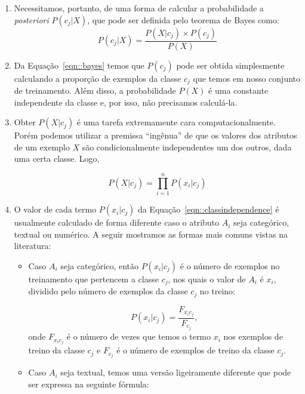 \begin{enumerate}
    \item Necessitamos, portanto, de uma forma de calcular a probabilidade a \textit{posteriori} $P(c_j| X)$, que pode ser definida pelo teorema de Bayes como:
\begin{equation}\label{eqn::bayes}
   P(c_{j}|X) = \frac{P(X|c_j) \times P(c_j) }{P(X)}
\end{equation}

    \item Da Equação~\ref{eqn::bayes} temos que $P(c_j)$ pode ser obtida simplesmente calculando a proporção de exemplos da classe $c_j$ que temos em nosso conjunto de treinamento. Além disso, a probabilidade $P(X)$ é uma constante independente da classe e, por isso, não precisamos calculá-la.
       
    \item Obter $P(X|c_j)$ é uma tarefa extremamente cara computacionalmente. Porém podemos utilizar a premissa ``ingênua'' 
    de que os valores dos atributos de um exemplo $X$ são condicionalmente independentes um dos outros, dada uma certa classe. Logo,

\begin{equation}\label{eqn::classindependence}
   P(X|c_{j}) = \prod^{n}_{i=1}{P(x_i|c_j) }
\end{equation}

\item O valor de cada termo $P(x_i|c_j)$ da Equação~\ref{eqn::classindependence} é usualmente calculado de forma diferente caso o atributo $A_i$ seja categórico, textual ou numérico. A seguir mostramos as formas mais comuns vistas na literatura:
    \begin{itemize}

        \item Caso $A_i$ seja categórico, então $P(x_i|c_j)$ é o número de exemplos no treinamento que pertencem a classe $c_j$, nos quais o valor de $A_i$ é $x_i$, dividido pelo número de exemplos da classe $c_j$ no treino:

    \begin{equation}\label{eqn::nbcattexto}
        P(x_i|c_j) = \frac{ F_{x_{i}c_{j}} }{ F_{c_{j}} },
    \end{equation}
        onde $F_{x_{i}c_{j}}$ é o número de vezes que temos o termo $x_i$ nos exemplos de treino da classe $c_j$ e $F_{c_{j}}$ é o número de exemplos de treino da classe $c_j$.
        
        \item Caso $A_i$ seja textual, temos uma versão ligeiramente diferente que pode ser expressa na seguinte fórmula:


\end{itemize}
\end{enumerate}
